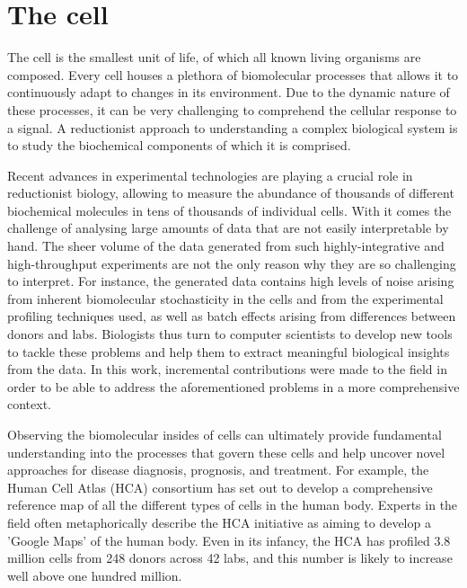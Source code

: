 
\section{The cell}
The cell is the smallest unit of life, of which all known living organisms are composed. Every cell houses a plethora of biomolecular processes that allows it to continuously adapt to changes in its environment. Due to the dynamic nature of these processes, it can be very challenging to comprehend the cellular response to a signal. A reductionist approach to understanding a complex biological system is to study the biochemical components of which it is comprised\cite{brigandt_reductionismbiology_2017}.

Recent advances in experimental technologies are playing a crucial role in reductionist biology, allowing to measure the abundance of thousands of different biochemical molecules in tens of thousands of individual cells. With it comes the challenge of analysing large amounts of data that are not easily interpretable by hand. The sheer volume of the data generated from such highly-integrative and high-throughput experiments are not the only reason why they are so challenging to interpret. For instance, the generated data contains high levels of noise arising from inherent biomolecular stochasticity in the cells and from the experimental profiling techniques used, as well as batch effects arising from differences between donors and labs\cite{hon_humancellatlas_2018}. Biologists thus turn to computer scientists
to develop new tools to tackle these problems and help them to extract meaningful biological insights from the data. In this work, incremental contributions were made to the field in order to be able to address the aforementioned problems in a more comprehensive context.

Observing the biomolecular insides of cells can ultimately provide fundamental understanding into the processes that govern these cells and help uncover novel approaches for disease diagnosis, prognosis, and treatment. For example, the Human Cell Atlas (HCA) consortium\cite{regev_humancellatlas_2018} has set out to develop a comprehensive reference map of all the different types of cells in the human body. Experts in the field often metaphorically describe the HCA initiative as aiming to develop a 'Google Maps' of the human body. Even in its infancy, the HCA has profiled 3.8 million cells from 248 donors across 42 labs\cite{humancellatlasconsortium_humancellatlas_2018}, and this number is likely to increase well above one hundred million.

